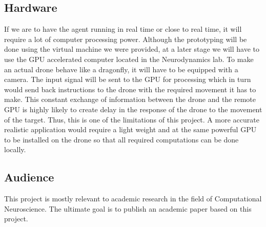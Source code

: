 \documentclass[a4paper,11pt]{article}
\begin{document}
\subsection{Hardware}
If we are to have the agent running in real time or close to real time, it will require a lot of computer processing power. Although the prototyping will be done using the virtual machine we were provided, at a later stage we will have to use the GPU accelerated computer located in the Neurodynamics lab.
To make an actual drone behave like a dragonfly, it will have to be equipped with a camera. The input signal will be sent to the GPU for processing which in turn would send back instructions to the drone with the required movement it has to make. This constant exchange of information between the drone and the remote GPU is highly likely to create delay in the response of the drone to the movement of the target. Thus, this is one of the limitations of this project. A more accurate realistic application would require a light weight and at the same powerful GPU to be installed on the drone so that all required computations can be done locally. 

\subsection{Audience}
This project is mostly relevant to academic research in the field of Computational Neuroscience. The ultimate goal is to publish an academic paper based on this project.


{}

\end{document}
